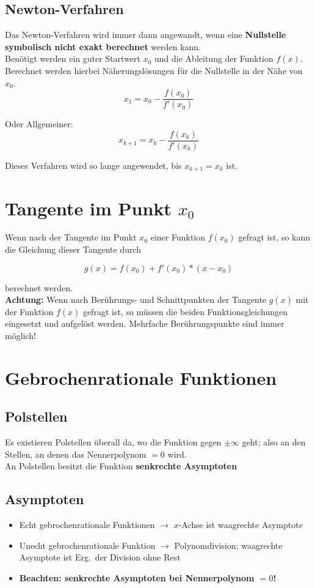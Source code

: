\documentclass[12pt, a4paper]{scrreprt}
\begin{document}
\subsection{Newton-Verfahren}

Das Newton-Verfahren wird immer dann angewandt, wenn eine \textbf{Nullstelle symbolisch nicht exakt berechnet} werden kann.\\
Benötigt werden ein guter Startwert \(x_0\) und die Ableitung der Funktion \(f(x)\). Berechnet werden hierbei Näherungslösungen für die Nullstelle in der Nähe von \(x_0\).\\
\[
  x_1 = x_0 - \frac{f(x_0)}{f'(x_0)}
\]

Oder Allgemeiner:
\[
  x_{k+1} = x_k - \frac{f(x_k)}{f'(x_k)}
\]

Dieses Verfahren wird so lange angewendet, bis \(x_{k+1} = x_k\) ist.

\section{Tangente im Punkt \(x_0\)}
Wenn nach der Tangente im Punkt \(x_0\) einer Funktion \(f(x_0)\) gefragt ist, so kann die Gleichung dieser Tangente durch

\[
  g(x)= f(x_0) + f'(x_0) * (x - x_0)
\]

berechnet werden.\\[1em]
\textbf{Achtung:} Wenn nach Berührungs- und Schnittpunkten der Tangente \(g(x)\) mit der Funktion \(f(x)\) gefragt ist, so müssen die beiden Funktionsgleichungen eingesetzt und aufgelöst werden. Mehrfache Berührungspunkte sind immer möglich!

\section{Gebrochenrationale Funktionen}

\subsection{Polstellen}
Es existieren Polstellen überall da, wo die Funktion gegen $\pm \infty$ geht; also an den Stellen, an denen das Nennerpolynom \(=0\) wird.\\
An Polstellen besitzt die Funktion \textbf{senkrechte Asymptoten}

\subsection{Asymptoten}
\begin{itemize}
\item Echt gebrochenrationale Funktionen $\rightarrow$ \(x\)-Achse ist waagrechte Asymptote
\item Unecht gebrochenrationale Funktion $\rightarrow$ Polynomdivision; waagrechte Asymptote ist Erg.\ der Division ohne Rest
\item \textbf{Beachten: senkrechte Asymptoten bei Nennerpolynom \(=0\)!}
\end{itemize}
\end{document}
